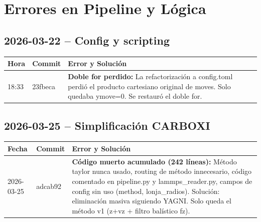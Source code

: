 \documentclass[12pt,a4paper]{article}
\begin{document}
\section*{Errores en Pipeline y Lógica}

\subsection*{2026-03-22 -- Config y scripting}

\begin{table}[H]
	\centering
	\begin{tabular}{@{}llp{9cm}@{}}
		\toprule
		\textbf{Hora} & \textbf{Commit} & \textbf{Error y Solución}                                                                                                                                     \\
		\midrule
		18:33         & 23fbeca         & \textbf{Doble for perdido:} La refactorización a config.toml perdió el producto cartesiano original de moves. Solo quedaba ymove=0. Se restauró el doble for. \\
		\bottomrule
	\end{tabular}
\end{table}

\subsection*{2026-03-25 -- Simplificación CARBOXI}

\begin{table}[H]
	\centering
	\begin{tabular}{@{}llp{9cm}@{}}
		\toprule
		\textbf{Fecha} & \textbf{Commit} & \textbf{Error y Solución}                                                                                                                                                                                                                                                                                           \\
		\midrule
		2026-03-25     & adcab92         & \textbf{Código muerto acumulado (242 líneas):} Método taylor nunca usado, routing de método innecesario, código comentado en pipeline.py y lammps\_reader.py, campos de config sin uso (method, lonja\_radios). Solución: eliminación masiva siguiendo YAGNI. Solo queda el método v1 (z+vz + filtro balístico fz). \\
		\bottomrule
	\end{tabular}
\end{table}
\end{document}
